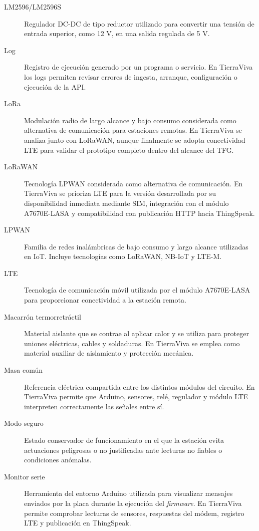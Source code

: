 \begin{description}
    \item[LM2596/LM2596S]
    Regulador DC-DC de tipo reductor utilizado para convertir una tensión de entrada superior, como 12 V, en una salida regulada de 5 V.

    \item[Log]
    Registro de ejecución generado por un programa o servicio. En TierraViva los logs permiten revisar errores de ingesta, arranque, configuración o ejecución de la API.

    \item[LoRa]
    Modulación radio de largo alcance y bajo consumo considerada como alternativa de comunicación para estaciones remotas. En TierraViva se analiza junto con LoRaWAN, aunque finalmente se adopta conectividad LTE para validar el prototipo completo dentro del alcance del TFG.

    \item[LoRaWAN]
    Tecnología LPWAN considerada como alternativa de comunicación. En TierraViva se prioriza LTE para la versión desarrollada por su disponibilidad inmediata mediante SIM, integración con el módulo A7670E-LASA y compatibilidad con publicación HTTP hacia ThingSpeak.

    \item[LPWAN]
    Familia de redes inalámbricas de bajo consumo y largo alcance utilizadas en IoT. Incluye tecnologías como LoRaWAN, NB-IoT y LTE-M.

    \item[LTE]
    Tecnología de comunicación móvil utilizada por el módulo A7670E-LASA para proporcionar conectividad a la estación remota.

    \item[Macarrón termorretráctil]
    Material aislante que se contrae al aplicar calor y se utiliza para proteger uniones eléctricas, cables y soldaduras. En TierraViva se emplea como material auxiliar de aislamiento y protección mecánica.

    \item[Masa común]
    Referencia eléctrica compartida entre los distintos módulos del circuito. En TierraViva permite que Arduino, sensores, relé, regulador y módulo LTE interpreten correctamente las señales entre sí.

    \item[Modo seguro]
    Estado conservador de funcionamiento en el que la estación evita actuaciones peligrosas o no justificadas ante lecturas no fiables o condiciones anómalas.

    \item[Monitor serie]
    Herramienta del entorno Arduino utilizada para visualizar mensajes enviados por la placa durante la ejecución del \textit{firmware}. En TierraViva permite comprobar lecturas de sensores, respuestas del módem, registro LTE y publicación en ThingSpeak.


\end{description}
